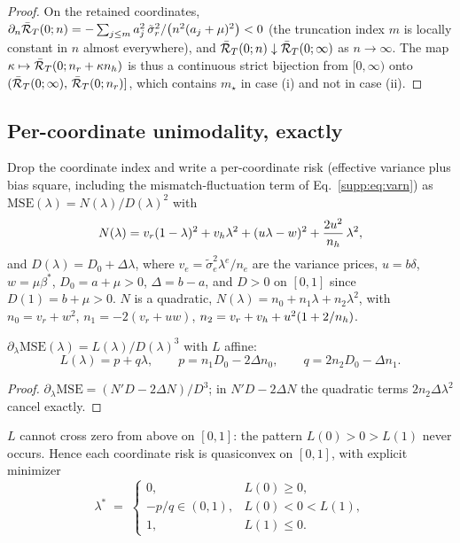 \begin{proof}
On the retained coordinates, $\partial_n \bar{\mathcal{R}}_T(0; n) = -\sum_{j \le m} a_j^2\, \tilde\sigma_r^2 / \big(n^2 (a_j + \mu)^2\big) < 0$ (the truncation index $m$ is locally constant in $n$ almost everywhere), and $\bar{\mathcal{R}}_T(0; n) \downarrow \bar{\mathcal{R}}_T(0; \infty)$ as $n \to \infty$.
The map $\kappa \mapsto \bar{\mathcal{R}}_T(0; n_r + \kappa n_h)$ is thus a continuous strict bijection from $[0, \infty)$ onto $(\bar{\mathcal{R}}_T(0; \infty),\, \bar{\mathcal{R}}_T(0; n_r)]$, which contains $m_\star$ in case (i) and not in case (ii).
\end{proof}

\subsection{Per-coordinate unimodality, exactly}

Drop the coordinate index and write a per-coordinate risk (effective variance plus bias square, including the mismatch-fluctuation term of Eq.~\eqref{supp:eq:varn}) as $\mathrm{MSE}(\lambda) = N(\lambda)/D(\lambda)^2$ with
\begin{equation}
N(\lambda) = v_r(1-\lambda)^2 + v_h\lambda^2 + (u\lambda - w)^2 + \frac{2u^2}{n_h}\,\lambda^2,
\end{equation}
and $D(\lambda) = D_0 + \Delta \lambda$, where $v_e = \tilde\sigma_e^2 \lambda^e / n_e$ are the variance prices, $u = b\delta$, $w = \mu\beta^*$, $D_0 = a + \mu > 0$, $\Delta = b - a$, and $D > 0$ on $[0,1]$ since $D(1) = b + \mu > 0$.
$N$ is a quadratic, $N(\lambda) = n_0 + n_1\lambda + n_2\lambda^2$, with $n_0 = v_r + w^2$, $n_1 = -2(v_r + uw)$, $n_2 = v_r + v_h + u^2(1 + 2/n_h)$.

\begin{lemma}\label{supp:lem:affine}
$\partial_\lambda \mathrm{MSE}(\lambda) = L(\lambda)/D(\lambda)^3$ with $L$ affine:
\begin{equation}
L(\lambda) = p + q\lambda,
\qquad
p = n_1 D_0 - 2\Delta n_0,
\qquad
q = 2 n_2 D_0 - \Delta n_1 .
\end{equation}
\end{lemma}

\begin{proof}
$\partial_\lambda \mathrm{MSE} = (N' D - 2\Delta N)/D^3$; in $N'D - 2\Delta N$ the quadratic terms $2 n_2 \Delta \lambda^2$ cancel exactly.
\end{proof}

\begin{proposition}\label{supp:prop:nomax}
$L$ cannot cross zero from above on $[0,1]$: the pattern $L(0) > 0 > L(1)$ never occurs.
Hence each coordinate risk is quasiconvex on $[0,1]$, with explicit minimizer
\begin{equation}
\lambda^* \;=\; \begin{cases}
0, & L(0) \ge 0,\\[2pt]
-p/q \in (0,1), & L(0) < 0 < L(1),\\[2pt]
1, & L(1) \le 0 .
\end{cases}
\label{supp:eq:lamstar}
\end{equation}
\end{proposition}

